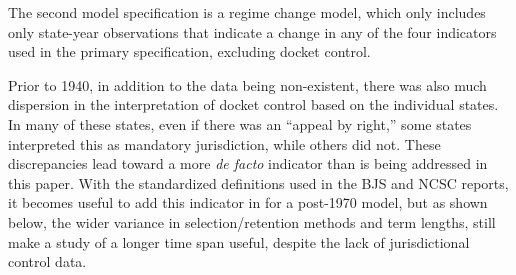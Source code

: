 \documentclass[12pt]{article}
\begin{document}
The second model specification is a regime change model, which only includes only state-year observations that indicate a change in any of the four indicators used in the primary specification, excluding docket control.  

Prior to 1940, in addition to the data being non-existent, there was also much dispersion in the interpretation of docket control based on the individual states.  In many of these states, even if there was an ``appeal by right,'' some states interpreted this as mandatory jurisdiction, while others did not.  These discrepancies lead toward a more \textit{de facto} indicator than is being addressed in this paper.  With the standardized definitions used in the BJS and NCSC reports, it becomes useful to add this indicator in for a post-1970 model, but as shown below, the wider variance in selection/retention methods and term lengths, still make a study of a longer time span useful, despite the lack of jurisdictional control data.  
\end{document}
